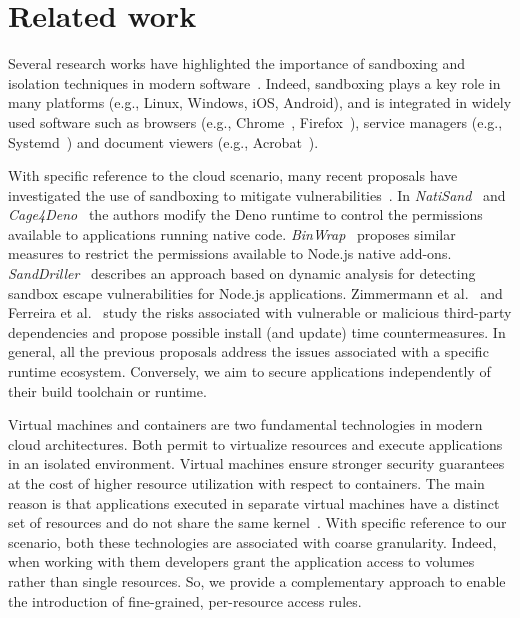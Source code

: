 \section{Related work}
\label{dmng:sect:related-work}

Several research works have highlighted the importance of sandboxing
and isolation techniques in modern software~\cite{kim2013practical,
  lsm_fra, berman1995tron, RLBox, seapp, ALBANESE2020934}. Indeed,
sandboxing plays a key role in many platforms (e.g., Linux, Windows,
iOS, Android), and is integrated in widely used software such as
browsers (e.g., Chrome~\cite{chromium-sandbox},
Firefox~\cite{firefox-sandbox}), service managers (e.g.,
Systemd~\cite{systemd-sandbox}) and document viewers (e.g.,
Acrobat~\cite{acrobat-sandbox}).

With specific reference to the cloud scenario, many recent proposals
have investigated the use of sandboxing to mitigate
vulnerabilities~\cite{natisand, cage4deno, enhance-wasm-sandbox,
  sanddriller-staicu, staicu2021bilingual, binwrap, zimmermann-risks,
  npm-malicious-update}. In {\em NatiSand}~\cite{natisand} and {\em
  Cage4Deno}~\cite{cage4deno} the authors modify the Deno runtime to
control the permissions available to applications running native
code. {\em BinWrap}~\cite{binwrap} proposes similar measures to
restrict the permissions available to Node.js native add-ons.  {\em
  SandDriller}~\cite{sanddriller-staicu} describes an approach based
on dynamic analysis for detecting sandbox escape vulnerabilities for
Node.js applications. Zimmermann et al.~\cite{zimmermann-risks} and
Ferreira et al.~\cite{npm-malicious-update} study the risks associated
with vulnerable or malicious third-party dependencies and propose
possible install (and update) time countermeasures. In general, all
the previous proposals address the issues associated with a specific
runtime ecosystem. Conversely, we aim to secure applications
independently of their build toolchain or runtime.

Virtual machines and containers are two fundamental technologies in
modern cloud architectures. Both permit to virtualize resources and
execute applications in an isolated environment. Virtual machines
ensure stronger security guarantees at the cost of higher resource
utilization with respect to containers. The main reason is that
applications executed in separate virtual machines have a distinct set
of resources and do not share the same
kernel~\cite{casola-optimization, CASOLA2018235}.  With specific
reference to our scenario, both these technologies are associated with
coarse granularity. Indeed, when working with them developers grant
the application access to volumes rather than single resources. So, we
provide a complementary approach to enable the introduction of
fine-grained, per-resource access rules.

